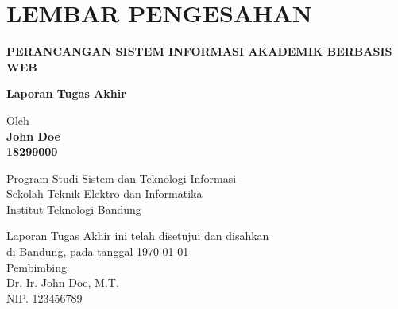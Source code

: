 \chapter*{LEMBAR PENGESAHAN}


\begin{center}
    \vspace{2cm}
  {\large\bfseries PERANCANGAN SISTEM INFORMASI AKADEMIK BERBASIS WEB}\\
     \vspace{2cm}

  {\Large \textbf{Laporan Tugas Akhir}}\\


  \vspace{1.5cm}
    
    
  {\large Oleh}\\[0.3cm]
    \textbf{
    {\large John Doe}\\
    {\large 18299000}
  }\\
    
  \vspace{0.5cm}
 
  {\large Program Studi Sistem dan Teknologi Informasi}\\
  {\large Sekolah Teknik Elektro dan Informatika}\\
  {\large Institut Teknologi Bandung}\\

  \vspace{1.5cm}

  Laporan Tugas Akhir ini telah disetujui dan disahkan\\ 
  di Bandung, pada tanggal \today\\[1cm]

	Pembimbing  \\[3cm]
	Dr. Ir. John Doe, M.T.   \\[0.2cm]
	NIP. 123456789 

\end{center}

\vspace{1cm}
\noindent



